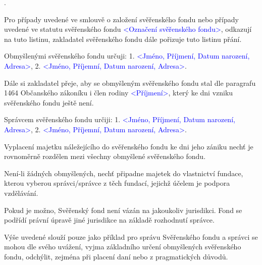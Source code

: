 \documentclass[parskip=half]{scrreprt}
\begin{document}
.

\begin{contract}



Pro případy uvedené ve smlouvě o založení svěřenského fondu nebo případy uvedené ve statutu svěřenského fondu \textcolor{blue}{<Označení svěřenského fondu>}, odkazují na tuto listinu, zakladatel svěřenského fondu dále pořizuje tuto listinu přání.


Obmyšlenými svěřenského fondu určuji:
1. \textcolor{blue}{<Jméno, Příjmení, Datum narození, Adresa>},
2. \textcolor{blue}{<Jméno, Příjemní, Datum narození, Adresa>}.

Dále si zakladatel přeje, aby se obmyšleným svěřenského fondu stal dle paragrafu 1464 Občanského zákoníku i člen rodiny \textcolor{blue}{<Příjmení>}, který ke dni vzniku svěřenského fondu ještě není.


Správcem svěřenského fondu určiji:
1. \textcolor{blue}{<Jméno, Příjmení, Datum narození, Adresa>},
2. \textcolor{blue}{<Jméno, Příjemní, Datum narození, Adresa>}.


Vyplacení majetku náležejícího do svěřenského fondu ke dni jeho zániku nechť je rovnoměrně rozdělen mezi všechny obmyšlené svěřenského fondu.

Není-li žádných obmyšlených, nechť připadne majetek do vlastnictví fundace, kterou vyberou správci/správce z těch fundací, jejichž účelem je podpora vzdělávání.



Pokud je možno, Svěřenský fond není vázán na jakoukoliv jurisdikci. Fond se podřídí právní úpravě jiné jurisdikce na základě rozhodnutí správce.

Výše uvedené slouží pouze jako příklad pro správu Svěřenského fondu a správci se mohou dle svého uvážení, vyjma základního určení obmyšlených svěřenského fondu, odchýlit, zejména při placení daní nebo z pragmatických důvodů.
	
\end{contract}
\newpage
\end{document}
